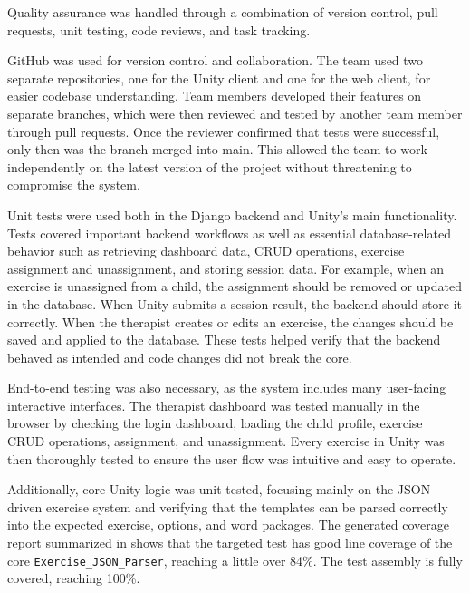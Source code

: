 Quality assurance was handled through a combination of version control, pull requests, unit testing, code reviews, and task tracking.

GitHub was used for version control and collaboration. The team used two separate repositories, one for the Unity client and one for the web client, for easier codebase understanding. Team members developed their features on separate branches, which were then reviewed and tested by another team member through pull requests. Once the reviewer confirmed that tests were successful, only then was the branch merged into main. This allowed the team to work independently on the latest version of the project without threatening to compromise the system.

Unit tests were used both in the Django backend and Unity's main functionality. Tests covered important backend workflows as well as essential database-related behavior such as retrieving dashboard data, CRUD operations, exercise assignment and unassignment, and storing session data. For example, when an exercise is unassigned from a child, the assignment should be removed or updated in the database. When Unity submits a session result, the backend should store it correctly. When the therapist creates or edits an exercise, the changes should be saved and applied to the database. These tests helped verify that the backend behaved as intended and code changes did not break the core.

End-to-end testing was also necessary, as the system includes many user-facing interactive interfaces. The therapist dashboard was tested manually in the browser by checking the login dashboard, loading the child profile, exercise CRUD operations, assignment, and unassignment. Every exercise in Unity was then thoroughly tested to ensure the user flow was intuitive and easy to operate.

Additionally, core Unity logic was unit tested, focusing mainly on the JSON-driven exercise system and verifying that the templates can be parsed correctly into the expected exercise, options, and word packages. The generated coverage report summarized in  shows that the targeted test has good line coverage of the core \texttt{Exercise\_JSON\_Parser}, reaching a little over 84\%. The test assembly is fully covered, reaching 100\%.

